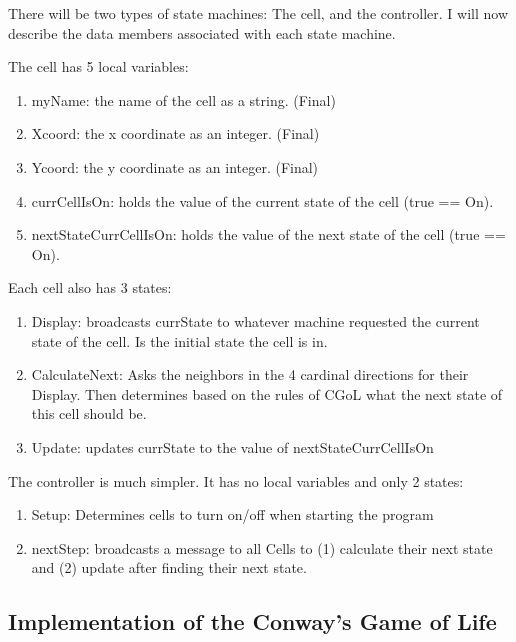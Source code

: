 There will be two types of state machines: The cell, and the controller.
I will now describe the data members associated with each state machine.

The cell has 5 local variables:
\begin{enumerate}
    \item myName: the name of the cell as a string. (Final)
    \item Xcoord: the x coordinate as an integer. (Final)
    \item Ycoord: the y coordinate as an integer. (Final)
    \item currCellIsOn: holds the value of the current state of the cell (true == On).
    \item nextStateCurrCellIsOn: holds the value of the next state of the cell (true == On).
\end{enumerate}

Each cell also has 3 states: 
\begin{enumerate}
    \item Display: broadcasts currState to whatever machine requested the current state of the cell.
    Is the initial state the cell is in.
    \item CalculateNext: Asks the neighbors in the 4 cardinal directions for their Display.
    Then determines based on the rules of CGoL what the next state of this cell should be.
    \item Update: updates currState to the value of nextStateCurrCellIsOn
\end{enumerate}

The controller is much simpler.
It has no local variables and only 2 states:

\begin{enumerate}
    \item Setup: Determines cells to turn on/off when starting the program
    \item nextStep: broadcasts a message to all Cells to (1) calculate their next state and (2) update after finding their next state.
\end{enumerate}

\subsection{Implementation of the Conway's Game of Life}


